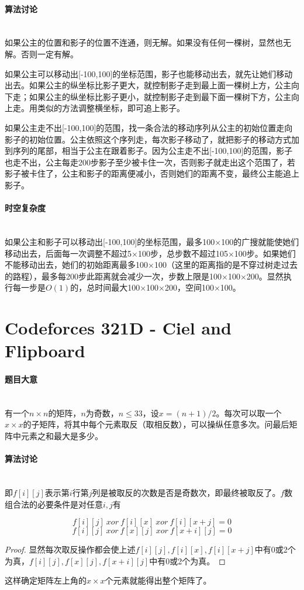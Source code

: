 \documentclass[UTF8]{ctexart}
\newcommand{\myparagraph}[1]{\paragraph{#1}\mbox{}\\}
\theoremstyle{nonumberplain}
\newtheorem{proof}{\hspace{1em}证明：}
\begin{document}
		\myparagraph{算法讨论}
			
			如果公主的位置和影子的位置不连通，则无解。如果没有任何一棵树，显然也无解。否则一定有解。
			
			如果公主可以移动出[-100,100]的坐标范围，影子也能移动出去，就先让她们移动出去。如果公主的纵坐标比影子更大，就控制影子走到最上面一棵树上方，公主向下走；如果公主的纵坐标比影子更小，就控制影子走到最下面一棵树下方，公主向上走。用类似的方法调整横坐标，即可追上影子。
			
			如果公主走不出[-100,100]的范围，找一条合法的移动序列从公主的初始位置走向影子的初始位置。公主依照这个序列走，每次影子移动了，就把影子的移动方式加到序列的尾部，相当于公主在跟着影子。因为公主走不出[-100,100]的范围，影子也走不出，公主每走200步影子至少被卡住一次，否则影子就走出这个范围了，若影子被卡住了，公主和影子的距离便减小，否则她们的距离不变，最终公主能追上影子。
			
		\myparagraph{时空复杂度}
			
			如果公主和影子可以移动出[-100,100]的坐标范围，最多100×100的广搜就能使她们移动出去，后面每一次调整不超过5×100步，总步数不超过105×100步。如果她们不能移动出去，她们的初始距离最多100×100（这里的距离指的是不穿过树走过去的路程），最多每200步此距离就会减少一次，步数上限是100×100×200。显然执行每一步是$O(1)$的，总时间最大100×100×200，空间100×100。
	
	\section{Codeforces 321D - Ciel and Flipboard}
	
		\myparagraph{题目大意}
		
			有一个$n \times n$的矩阵，$n$为奇数，$n \leq 33$，设$x=(n+1)/2$。每次可以取一个$x \times x$的子矩阵，将其中每个元素取反（取相反数），可以操纵任意多次。问最后矩阵中元素之和最大是多少。
			
		\myparagraph{算法讨论}
		
			即$f[i][j]$表示第$i$行第$j$列是被取反的次数是否是奇数次，即最终被取反了。$f$数组合法的必要条件是对任意$i,j$有
			
			$$f[i][j]\ xor\ f[i][x]\ xor\ f[i][x+j]=0$$
			$$f[i][j]\ xor\ f[x][j]\ xor\ f[x+i][j]=0$$
			
			\begin{proof}显然每次取反操作都会使上述$f[i][j],f[i][x],f[i][x+j]$中有0或2个为真，$f[i][j],f[x][j],f[x+i][j]$中有0或2个为真。\end{proof}
			
			这样确定矩阵左上角的$x \times x$个元素就能得出整个矩阵了。
			
\end{document}
